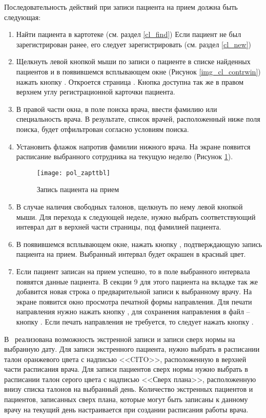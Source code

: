 Последовательность действий при записи пациента на прием должна быть следующая:
\begin{enumerate}
 \item Найти пациента в картотеке (см. раздел \ref{cl_find}) Если пациент не был зарегистрирован ранее, его следует зарегистрировать (см. раздел \ref{cl_new})
 \item Щелкнуть левой кнопкой мыши по записи о пациенте в списке найденных пациентов и в появившемся всплывающем окне (Рисунок \ref{img_cl_contrwin}) нажать кнопку . Откроется страница . Кнопка  доступна так же в правом верхнем углу регистрационной карточки пациента.  
 \item В правой части окна, в поле поиска врача, ввести фамилию или специальность врача. В результате, список врачей, расположенный ниже поля поиска, будет отфильтрован согласно условиям поиска.
 \item Установить флажок напротив фамилии нижного врача. На экране появится расписание выбранного сотрудника на текущую неделю (Рисунок \ref{img_pol_zapttbl}).
 
 \begin{figure}[ht]\centering
  \texttt{[image: pol\_zapttbl]}
  \caption{Запись пациента на прием}
  \label{img_pol_zapttbl}
 \end{figure}
 
 \item В случае наличия свободных талонов, щелкнуть по нему левой кнопкой мыши. Для перехода к следующей неделе, нужно выбрать соответствующий интеврал дат в верхней части страницы, под фамилией пациента.
 \item В появившемся всплывающем окне, нажать кнопку , подтверждающую запись пациента на прием. Выбранный интервал будет окрашен в красный цвет.
 \item Если пациент записан на прием успешно, то в поле  выбранного интервала появятся данные пациента. В секции 9 для этого пациента на вкладке  так же добавится новая строка о предварительной записи к выбранному врачу. На экране появится окно просмотра печатной формы направления. Для печати направления нужно нажать кнопку , для сохранения направления в файл – кнопку . Если печать направления не требуется, то следует нажать кнопку .
\end{enumerate}
  
В \tmis~реализована возможность экстренной записи и записи сверх нормы на выбранную дату. Для записи экстренного пациента, нужно выбрать в расписании талон оранжевого цвета с надписью <<CITO>>, расположенную в верхней части расписания врача. Для записи пациентов сверх нормы нужно выбрать в расписании талон серого цвета с надписью <<Сверх плана>>, расположенную внизу списка талонов на выбранный день. Количество экстренных пациентов и пациентов, записанных сверх плана, которые могут быть записаны к данному врачу на текущий день настраивается при создании расписания работы врача. 

